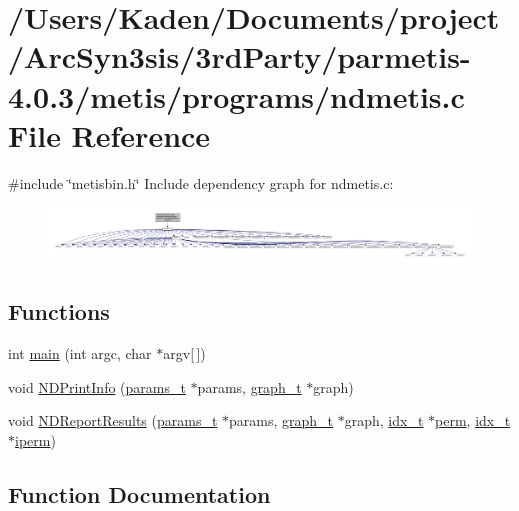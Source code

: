 \hypertarget{a00326}{}\section{/\+Users/\+Kaden/\+Documents/project/\+Arc\+Syn3sis/3rd\+Party/parmetis-\/4.0.3/metis/programs/ndmetis.c File Reference}
\label{a00326}
{\ttfamily \#include \char`\"{}metisbin.\+h\char`\"{}}\newline
Include dependency graph for ndmetis.\+c\+:\nopagebreak
\begin{figure}[H]
\begin{center}
\leavevmode
\includegraphics[width=350pt]{a00327}
\end{center}
\end{figure}
\subsection*{Functions}
\begin{DoxyCompactItemize}
\item 
int \hyperlink{a00326_a0ddf1224851353fc92bfbff6f499fa97}{main} (int argc, char $\ast$argv\mbox{[}$\,$\mbox{]})
\item 
void \hyperlink{a00326_aef57dff33874ea99e9584665424dbf22}{N\+D\+Print\+Info} (\hyperlink{a00706}{params\+\_\+t} $\ast$params, \hyperlink{a00734}{graph\+\_\+t} $\ast$graph)
\item 
void \hyperlink{a00326_ae474b9ac69c59e61afcdd45e4c2913f0}{N\+D\+Report\+Results} (\hyperlink{a00706}{params\+\_\+t} $\ast$params, \hyperlink{a00734}{graph\+\_\+t} $\ast$graph, \hyperlink{a00876_aaa5262be3e700770163401acb0150f52}{idx\+\_\+t} $\ast$\hyperlink{a00879_ab96e9eb84fc7c342d17690a1341645dd}{perm}, \hyperlink{a00876_aaa5262be3e700770163401acb0150f52}{idx\+\_\+t} $\ast$\hyperlink{a00879_a76ba0ee1ced7914ce87ac7eab1758c42}{iperm})
\end{DoxyCompactItemize}


\subsection{Function Documentation}
\mbox{\label{a00326_a0ddf1224851353fc92bfbff6f499fa97}} 
